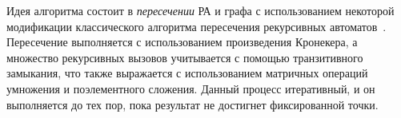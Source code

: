 Идея алгоритма состоит в \textit{пересечении} РА и графа с использованием некоторой модификации классического алгоритма пересечения рекурсивных автоматов~\cite{book:automata_theory}. Пересечение выполняется с использованием произведения Кронекера, а множество рекурсивных вызовов учитывается с помощью транзитивного замыкания, что также выражается с использованием матричных операций умножения и поэлементного сложения. Данный процесс итеративный, и он выполняется до тех пор, пока результат не достигнет фиксированной точки.









